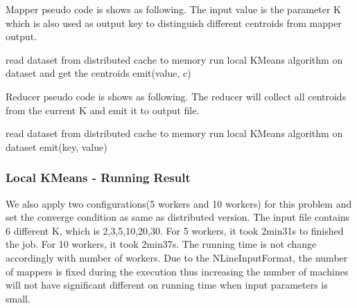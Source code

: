 \documentclass[11pt]{article} %
\begin{document}
Mapper pseudo code is shows as following. The input value is the  parameter K which is also used as output key to distinguish different centroids from mapper output.

\begin{algorithmic}[1]
\State read dataset from distributed cache to memory
\State run local KMeans algorithm on dataset and get the centroids
	\State emit(value, c)
\EndFor
\EndFunction
\end{algorithmic}

Reducer pseudo code is shows as following. The reducer will collect all centroids from the current K and emit it to output file.
\begin{algorithmic}[1]
\State read dataset from distributed cache to memory
\State run local KMeans algorithm on dataset
	\State emit(key, value)
\EndFor
\EndFunction
\end{algorithmic}

\subsubsection{Local KMeans - Running Result}
We also apply two configurations(5 workers and 10 workers) for this problem and set the converge condition as same as distributed version. The input file contains 6 different K, which is 2,3,5,10,20,30. For 5 workers, it took 2min31s to finished the job. For 10 workers, it took 2min37s. The running time is not change accordingly with number of workers. Due to the NLineInputFormat, the number of mappers is fixed during the execution thus increasing the number of machines will not have significant different on running time when input parameters is small. 
\end{document}
